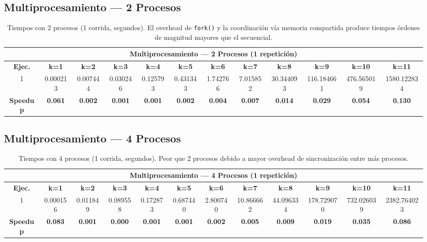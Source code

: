 \documentclass{article}
\begin{document}
\subsection{Multiprocesamiento --- 2 Procesos}

\begin{table}[H]
\centering
\tiny
\begin{tabular}{|c|c|c|c|c|c|c|c|c|c|c|c|}
\hline
\multicolumn{12}{|c|}{\textbf{Multiprocesamiento --- 2 Procesos (1 repetición)}} \\
\hline
\textbf{Ejec.} & \textbf{k=1} & \textbf{k=2} & \textbf{k=3} & \textbf{k=4} & \textbf{k=5} & \textbf{k=6} & \textbf{k=7} & \textbf{k=8} & \textbf{k=9} & \textbf{k=10} & \textbf{k=11} \\
\hline
1 & 0.000213 & 0.007444 & 0.030246 & 0.125793 & 0.431343 & 1.742766 & 7.015852 & 30.344093 & 116.184661 & 476.565019 & 1580.122834 \\
\hline
\textbf{Speedup} & \textbf{0.061} & \textbf{0.002} & \textbf{0.001} & \textbf{0.001} & \textbf{0.002} & \textbf{0.004} & \textbf{0.007} & \textbf{0.014} & \textbf{0.029} & \textbf{0.054} & \textbf{0.130} \\
\hline
\end{tabular}
\caption{Tiempos con 2 procesos (1 corrida, segundos). El overhead de \texttt{fork()} y la coordinación vía memoria compartida produce tiempos órdenes de magnitud mayores que el secuencial.}
\label{tab:mp2}
\end{table}

\subsection{Multiprocesamiento --- 4 Procesos}

\begin{table}[H]
\centering
\tiny
\begin{tabular}{|c|c|c|c|c|c|c|c|c|c|c|c|}
\hline
\multicolumn{12}{|c|}{\textbf{Multiprocesamiento --- 4 Procesos (1 repetición)}} \\
\hline
\textbf{Ejec.} & \textbf{k=1} & \textbf{k=2} & \textbf{k=3} & \textbf{k=4} & \textbf{k=5} & \textbf{k=6} & \textbf{k=7} & \textbf{k=8} & \textbf{k=9} & \textbf{k=10} & \textbf{k=11} \\
\hline
1 & 0.000156 & 0.011849 & 0.089558 & 0.172873 & 0.687440 & 2.800740 & 10.866662 & 44.096334 & 178.729070 & 732.026039 & 2382.764023 \\
\hline
\textbf{Speedup} & \textbf{0.083} & \textbf{0.001} & \textbf{0.000} & \textbf{0.001} & \textbf{0.001} & \textbf{0.002} & \textbf{0.005} & \textbf{0.009} & \textbf{0.019} & \textbf{0.035} & \textbf{0.086} \\
\hline
\end{tabular}
\caption{Tiempos con 4 procesos (1 corrida, segundos). Peor que 2 procesos debido a mayor overhead de sincronización entre más procesos.}
\label{tab:mp4}
\end{table}
\end{document}
